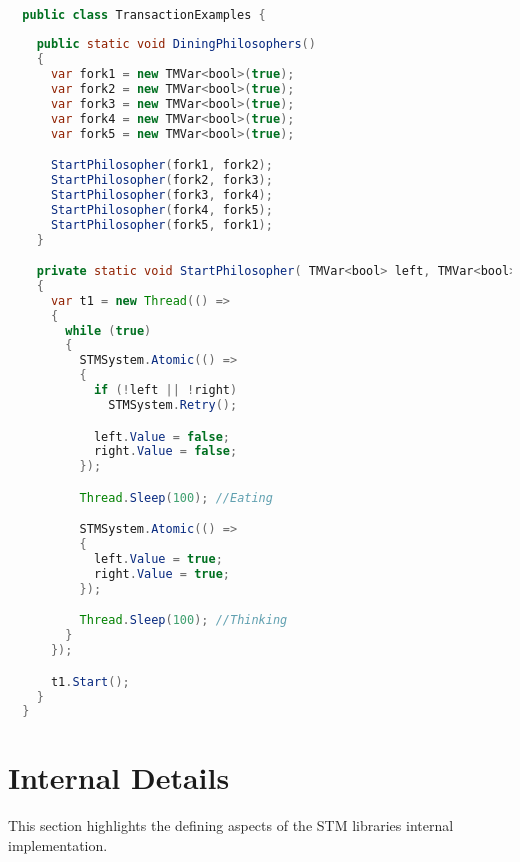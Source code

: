 \begin{lstlisting}[label=lst:library_dinning,
  caption={Library Dining Philosophers},
  language=Java,  
  showspaces=false,
  showtabs=false,
  breaklines=true,
  showstringspaces=false,
  breakatwhitespace=true,
  commentstyle=\color{greencomments},
  keywordstyle=\color{bluekeywords},
  stringstyle=\color{redstrings},
  morekeywords={atomic, retry, orElse, var, get, set}]  % Start your code-block

  public class TransactionExamples {
    
    public static void DiningPhilosophers()
    {
      var fork1 = new TMVar<bool>(true);
      var fork2 = new TMVar<bool>(true);
      var fork3 = new TMVar<bool>(true);
      var fork4 = new TMVar<bool>(true);
      var fork5 = new TMVar<bool>(true);

      StartPhilosopher(fork1, fork2);
      StartPhilosopher(fork2, fork3);
      StartPhilosopher(fork3, fork4);
      StartPhilosopher(fork4, fork5);
      StartPhilosopher(fork5, fork1);
    }

    private static void StartPhilosopher( TMVar<bool> left, TMVar<bool> right)
    {
      var t1 = new Thread(() =>
      {
        while (true)
        {
          STMSystem.Atomic(() =>
          {
            if (!left || !right)
              STMSystem.Retry();

            left.Value = false;
            right.Value = false;
          });

          Thread.Sleep(100); //Eating

          STMSystem.Atomic(() =>
          {
            left.Value = true;
            right.Value = true;
          });

          Thread.Sleep(100); //Thinking
        }
      });

      t1.Start();
    }
  }
\end{lstlisting}

\section{Internal Details}
\label{sec:stm_impl_internal_detials}
This section highlights the defining aspects of the \ac{STM} libraries internal implementation.
